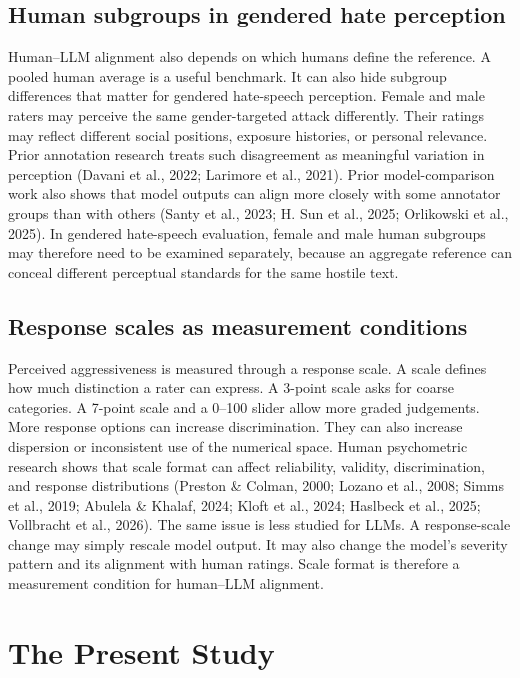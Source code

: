 \documentclass[a4paper,fleqn,review,longmktitle]{cas-sc}
\begin{document}
\subsection{Human subgroups in gendered hate perception}

Human--LLM alignment also depends on which humans define the reference. A pooled human average is a useful benchmark. It can also hide subgroup differences that matter for gendered hate-speech perception. Female and male raters may perceive the same gender-targeted attack differently. Their ratings may reflect different social positions, exposure histories, or personal relevance. Prior annotation research treats such disagreement as meaningful variation in perception (Davani et al., 2022; Larimore et al., 2021). Prior model-comparison work also shows that model outputs can align more closely with some annotator groups than with others (Santy et al., 2023; H. Sun et al., 2025; Orlikowski et al., 2025). In gendered hate-speech evaluation, female and male human subgroups may therefore need to be examined separately, because an aggregate reference can conceal different perceptual standards for the same hostile text.

\subsection{Response scales as measurement conditions}

Perceived aggressiveness is measured through a response scale. A scale defines how much distinction a rater can express. A 3-point scale asks for coarse categories. A 7-point scale and a 0--100 slider allow more graded judgements. More response options can increase discrimination. They can also increase dispersion or inconsistent use of the numerical space. Human psychometric research shows that scale format can affect reliability, validity, discrimination, and response distributions (Preston \& Colman, 2000; Lozano et al., 2008; Simms et al., 2019; Abulela \& Khalaf, 2024; Kloft et al., 2024; Haslbeck et al., 2025; Vollbracht et al., 2026). The same issue is less studied for LLMs. A response-scale change may simply rescale model output. It may also change the model's severity pattern and its alignment with human ratings. Scale format is therefore a measurement condition for human--LLM alignment.

\section{The Present Study}
\label{sec:present-study}
\end{document}
